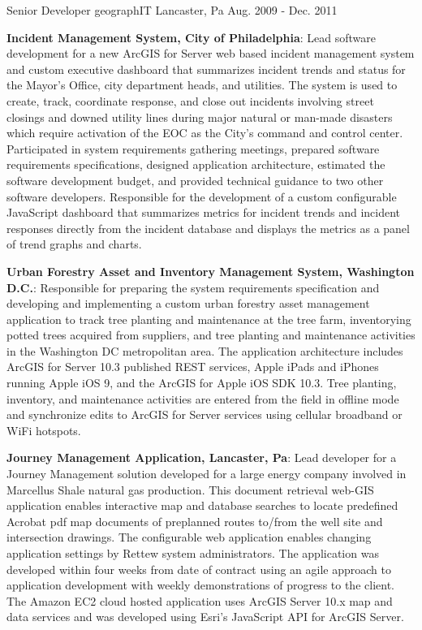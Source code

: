 \begin{cventries}
{    }
  \cventry
    {Senior Developer}
    {geographIT}
    {Lancaster, Pa}
    {Aug. 2009 - Dec. 2011}
    {
      \begin{cvitems}
        \item{\textbf{Incident Management System, City of Philadelphia}: Lead software development for a new ArcGIS for Server web based incident management system and custom executive dashboard that summarizes incident trends and status for the Mayor’s Office, city department heads, and utilities.  The system is used to create, track, coordinate response, and close out incidents involving street closings and downed utility lines during major natural or man-made disasters which require activation of the EOC as the City’s command and control center.  Participated in system requirements gathering meetings, prepared software requirements specifications, designed application architecture, estimated the software development budget, and provided technical guidance to two other software developers.  Responsible for the development of a custom configurable JavaScript dashboard that summarizes metrics for incident trends and incident responses directly from the incident database and displays the metrics as a panel of trend graphs and charts.}
        \bigskip
        \item{\textbf{Urban Forestry Asset and Inventory Management System, Washington D.C.}: Responsible for preparing the system requirements specification and developing and implementing a custom urban forestry asset management application to track tree planting and maintenance at the tree farm, inventorying potted trees acquired from suppliers, and tree planting and maintenance activities in the Washington DC metropolitan area.  The application architecture includes ArcGIS for Server 10.3 published REST services, Apple iPads and iPhones running Apple iOS 9, and the ArcGIS for Apple iOS SDK 10.3.  Tree planting, inventory, and maintenance activities are entered from the field in offline mode and synchronize edits to ArcGIS for Server services using cellular broadband or WiFi hotspots.}
        \bigskip
        \item{\textbf{Journey Management Application, Lancaster, Pa}: Lead developer for a Journey Management solution developed for a large energy company involved in Marcellus Shale natural gas production.  This document retrieval web-GIS application enables interactive map and database searches to locate predefined Acrobat pdf map documents of preplanned routes to/from the well site and intersection drawings.  The configurable web application enables changing application settings by Rettew system administrators.  The application was developed within four weeks from date of contract using an agile approach to application development with weekly demonstrations of progress to the client.  The Amazon EC2 cloud hosted application uses ArcGIS Server 10.x map and data services and was developed using Esri’s JavaScript API for ArcGIS Server.}

\end{cvitems}}
\end{cventries}
